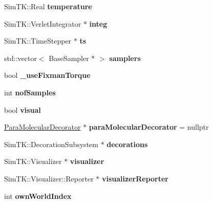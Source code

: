 \begin{DoxyCompactItemize}
\item 
Sim\+T\+K\+::\+Real {\bfseries temperature}\hypertarget{classWorld_af6e99c28c46a3028b19bdd9eddf1e32d}{}\label{classWorld_af6e99c28c46a3028b19bdd9eddf1e32d}

\item 
Sim\+T\+K\+::\+Verlet\+Integrator $\ast$ {\bfseries integ}\hypertarget{classWorld_a0c1825a5bccd943e622667d4f2361bfb}{}\label{classWorld_a0c1825a5bccd943e622667d4f2361bfb}

\item 
Sim\+T\+K\+::\+Time\+Stepper $\ast$ {\bfseries ts}\hypertarget{classWorld_adcb1faeb373c470571e2ab170f7a324a}{}\label{classWorld_adcb1faeb373c470571e2ab170f7a324a}

\item 
std\+::vector$<$ Base\+Sampler $\ast$ $>$ {\bfseries samplers}\hypertarget{classWorld_a138dac67fc55edc3464cea3ce7efb927}{}\label{classWorld_a138dac67fc55edc3464cea3ce7efb927}

\item 
bool {\bfseries \+\_\+use\+Fixman\+Torque}\hypertarget{classWorld_a5820bfb2de987a51015b86900d55c076}{}\label{classWorld_a5820bfb2de987a51015b86900d55c076}

\item 
int {\bfseries nof\+Samples}\hypertarget{classWorld_a94879de144abf83cc275d9306eeab37f}{}\label{classWorld_a94879de144abf83cc275d9306eeab37f}

\item 
bool {\bfseries visual}\hypertarget{classWorld_a204e8ead4fb79fdbfd6b5b7738eca7d9}{}\label{classWorld_a204e8ead4fb79fdbfd6b5b7738eca7d9}

\item 
\hyperlink{classParaMolecularDecorator}{Para\+Molecular\+Decorator} $\ast$ {\bfseries para\+Molecular\+Decorator} = nullptr\hypertarget{classWorld_aa1960e6a68168fbdac28cbda7f2dbba8}{}\label{classWorld_aa1960e6a68168fbdac28cbda7f2dbba8}

\item 
Sim\+T\+K\+::\+Decoration\+Subsystem $\ast$ {\bfseries decorations}\hypertarget{classWorld_abf703a0e3e84b43b0b33dcd2de3fa2ea}{}\label{classWorld_abf703a0e3e84b43b0b33dcd2de3fa2ea}

\item 
Sim\+T\+K\+::\+Visualizer $\ast$ {\bfseries visualizer}\hypertarget{classWorld_a2174a847c16ebce5fd6aa9cca5ef4075}{}\label{classWorld_a2174a847c16ebce5fd6aa9cca5ef4075}

\item 
Sim\+T\+K\+::\+Visualizer\+::\+Reporter $\ast$ {\bfseries visualizer\+Reporter}\hypertarget{classWorld_a8fe1c13cc40f1d32ecfb97fbacf01a31}{}\label{classWorld_a8fe1c13cc40f1d32ecfb97fbacf01a31}

\item 
int {\bfseries own\+World\+Index}\hypertarget{classWorld_a01aa97e5cd329fe3b4f5cefd86ecdc07}{}\label{classWorld_a01aa97e5cd329fe3b4f5cefd86ecdc07}

\end{DoxyCompactItemize}


